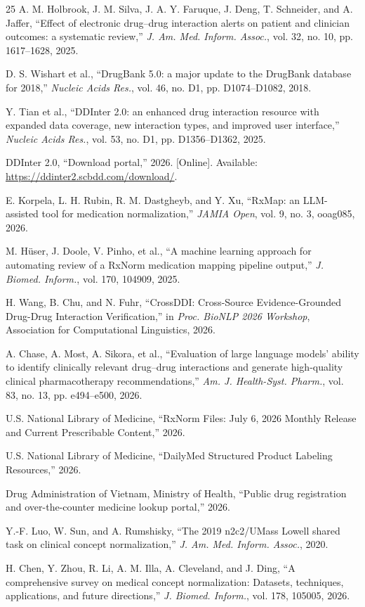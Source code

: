 \documentclass[11pt]{article}
\begin{document}
\begin{thebibliography}{25}
A. M. Holbrook, J. M. Silva, J. A. Y. Faruque, J. Deng, T. Schneider, and A. Jaffer,
``Effect of electronic drug--drug interaction alerts on patient and clinician outcomes: a systematic review,''
\emph{J. Am. Med. Inform. Assoc.}, vol. 32, no. 10, pp. 1617--1628, 2025.

D. S. Wishart et al., ``DrugBank 5.0: a major update to the DrugBank database for 2018,''
\emph{Nucleic Acids Res.}, vol. 46, no. D1, pp. D1074--D1082, 2018.

Y. Tian et al., ``DDInter 2.0: an enhanced drug interaction resource with expanded data coverage, new interaction types, and improved user interface,''
\emph{Nucleic Acids Res.}, vol. 53, no. D1, pp. D1356--D1362, 2025.

DDInter 2.0, ``Download portal,'' 2026. [Online]. Available: \url{https://ddinter2.scbdd.com/download/}.

E. Korpela, L. H. Rubin, R. M. Dastgheyb, and Y. Xu,
``RxMap: an LLM-assisted tool for medication normalization,''
\emph{JAMIA Open}, vol. 9, no. 3, ooag085, 2026.

M. H\"user, J. Doole, V. Pinho, et al.,
``A machine learning approach for automating review of a RxNorm medication mapping pipeline output,''
\emph{J. Biomed. Inform.}, vol. 170, 104909, 2025.

H. Wang, B. Chu, and N. Fuhr, ``CrossDDI: Cross-Source Evidence-Grounded Drug-Drug Interaction Verification,'' in \emph{Proc. BioNLP 2026 Workshop}, Association for Computational Linguistics, 2026.

A. Chase, A. Most, A. Sikora, et al.,
``Evaluation of large language models' ability to identify clinically relevant drug--drug interactions and generate high-quality clinical pharmacotherapy recommendations,''
\emph{Am. J. Health-Syst. Pharm.}, vol. 83, no. 13, pp. e494--e500, 2026.

U.S. National Library of Medicine, ``RxNorm Files: July 6, 2026 Monthly Release and Current Prescribable Content,'' 2026.

U.S. National Library of Medicine, ``DailyMed Structured Product Labeling Resources,'' 2026.

Drug Administration of Vietnam, Ministry of Health, ``Public drug registration and over-the-counter medicine lookup portal,'' 2026.

Y.-F. Luo, W. Sun, and A. Rumshisky, ``The 2019 n2c2/UMass Lowell shared task on clinical concept normalization,'' \emph{J. Am. Med. Inform. Assoc.}, 2020.

H. Chen, Y. Zhou, R. Li, A. M. Illa, A. Cleveland, and J. Ding, ``A comprehensive survey on medical concept normalization: Datasets, techniques, applications, and future directions,'' \emph{J. Biomed. Inform.}, vol. 178, 105005, 2026.

\end{thebibliography}
\end{document}
